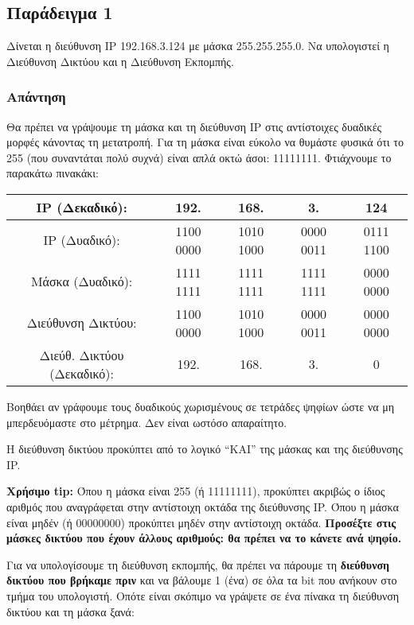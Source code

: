 \subsection*{Παράδειγμα 1}

Δίνεται η διεύθυνση IP 192.168.3.124 με μάσκα 255.255.255.0. Να υπολογιστεί η Διεύθυνση Δικτύου και η Διεύθυνση Εκπομπής.

\subsubsection*{Απάντηση}

Θα πρέπει να γράψουμε τη μάσκα και τη διεύθυνση IP στις αντίστοιχες δυαδικές μορφές κάνοντας τη μετατροπή. Για τη μάσκα είναι εύκολο να θυμάστε φυσικά ότι το 255 (που συναντάται πολύ συχνά) είναι απλά οκτώ άσοι: 11111111. Φτιάχνουμε το παρακάτω πινακάκι:

\begin{center}
\fontsize{9}{11}
\ttfamily
\begin{tabular}{|c|c|c|c|c|}
\hline
 IP (Δεκαδικό): & 192. & 168. & 3. & 124 \\ 
\hline
 IP (Δυαδικό): & 1100 0000 & 1010 1000 & 0000 0011 & 0111 1100\\
\hline
 Μάσκα (Δυαδικό): & 1111 1111 & 1111 1111 & 1111 1111 & 0000 0000\\
 \hline
 Διεύθυνση Δικτύου: & 1100 0000 & 1010 1000 & 0000 0011 & 0000 0000\\
 \hline
 Διεύθ. Δικτύου (Δεκαδικό): & 192. & 168. & 3. & 0\\
 \hline 
\end{tabular}
\normalfont
\end{center}

Βοηθάει αν γράφουμε τους δυαδικούς χωρισμένους σε τετράδες ψηφίων ώστε να μη μπερδευόμαστε στο μέτρημα. Δεν είναι ωστόσο απαραίτητο.

Η διεύθυνση δικτύου προκύπτει από το λογικό ``ΚΑΙ'' της μάσκας και της διεύθυνσης IP.

\begin{inthebox}
\textbf{Χρήσιμο tip:} Όπου η μάσκα είναι 255 (ή 11111111), προκύπτει ακριβώς ο ίδιος αριθμός που αναγράφεται στην αντίστοιχη οκτάδα της διεύθυνσης IP. Όπου η μάσκα είναι μηδέν (ή 00000000) προκύπτει μηδέν στην αντίστοιχη οκτάδα. \textbf{Προσέξτε στις μάσκες δικτύου που έχουν άλλους αριθμούς: θα πρέπει να το κάνετε ανά ψηφίο.}\\
\end{inthebox}

Για να υπολογίσουμε τη διεύθυνση εκπομπής, θα πρέπει να πάρουμε τη \textbf{διεύθυνση δικτύου που βρήκαμε πριν} και να βάλουμε 1 (ένα) σε όλα τα bit που ανήκουν στο τμήμα του υπολογιστή. Οπότε είναι σκόπιμο να γράψετε σε ένα πίνακα τη διεύθυνση δικτύου και τη μάσκα ξανά:

